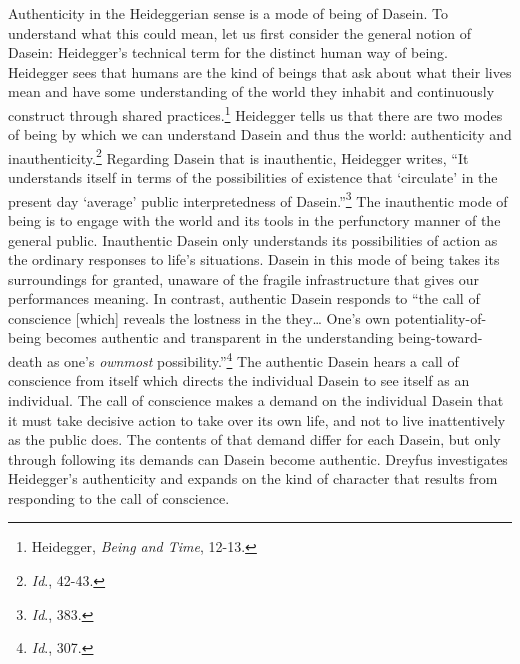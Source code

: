 Authenticity in the Heideggerian sense is a mode of being of Dasein. To
understand what this could mean, let us first consider the general
notion of Dasein: Heidegger's technical term for the distinct human way
of being. Heidegger sees that humans are the kind of beings that ask
about what their lives mean and have some understanding of the world
they inhabit and continuously construct through shared
practices.\footnote{Heidegger, \emph{Being and Time}, 12-13.} Heidegger
tells us that there are two modes of being by which we can understand
Dasein and thus the world: authenticity and inauthenticity.\footnote{\emph{Id}.,
  42-43.} Regarding Dasein that is inauthentic, Heidegger writes, ``It
understands itself in terms of the possibilities of existence that
`circulate' in the present day `average' public interpretedness of
Dasein.''\footnote{\emph{Id}., 383.} The inauthentic mode of being is to
engage with the world and its tools in the perfunctory manner of the
general public. Inauthentic Dasein only understands its possibilities of
action as the ordinary responses to life's situations. Dasein in this
mode of being takes its surroundings for granted, unaware of the fragile
infrastructure that gives our performances meaning. In contrast,
authentic Dasein responds to ``the call of conscience {[}which{]}
reveals the lostness in the they\ldots{} One's own potentiality-of-being
becomes authentic and transparent in the understanding
being-toward-death as one's \emph{ownmost} possibility.''\footnote{\emph{Id}.,
  307.} The authentic Dasein hears a call of conscience from itself
which directs the individual Dasein to see itself as an individual. The
call of conscience makes a demand on the individual Dasein that it must
take decisive action to take over its own life, and not to live
inattentively as the public does. The contents of that demand differ for
each Dasein, but only through following its demands can Dasein become
authentic. Dreyfus investigates Heidegger's authenticity and expands on
the kind of character that results from responding to the call of
conscience.

